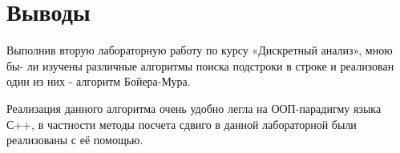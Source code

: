 \section{Выводы}

Выполнив вторую лабораторную работу по курсу «Дискретный анализ», мною бы-
ли изучены различные алгоритмы поиска подстроки в строке и реализован один из них - алгоритм Бойера-Мура.\newline

Реализация данного алгоритма очень удобно легла на ООП-парадигму языка С++, в частности методы посчета сдвиго в данной лабораторной были реализованы с её помощью.\newline

\pagebreak